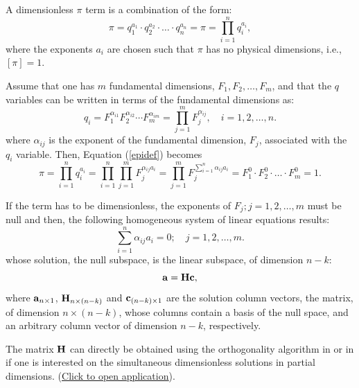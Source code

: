 \documentclass[
	11pt, %
	fleqn, %
	a4paper, %
]{LegrandOrangeBook}
\begin{document}
\begin{definition}
A dimensionless $\pi$ term is a combination of the form:
\begin{equation}\label{epidef}
\pi = q_1^{a_1} \cdot q_2^{a_2} \cdot \ldots \cdot q_n^{a_n} = \pi =\prod\limits_{i=1}^{n} q_i^{a_i},
\end{equation}
where the exponents $a_i$ are chosen such that $\pi$ has no physical dimensions, i.e., $[\pi] = 1$.
\end{definition}

Assume that one has $m$ fundamental dimensions, $F_1, F_2,\dots,F_m$, and that the $q$ variables can be written in terms of the fundamental dimensions as:
\begin{equation}
q_i = F_1^{\alpha_{i1}} F_2^{\alpha_{i2}} \cdots F_m^{\alpha_{im}} = \prod\limits_{j=1}^{m} F_j^{\alpha_{ij}},\quad i=1,2,\dots,n.
\end{equation}
where $\alpha_{ij}$ is the exponent of the fundamental dimension, $F_j$, associated with the $q_i$ variable.
Then, Equation (\ref{epidef}) becomes
\begin{equation}
\pi = \prod\limits_{i=1}^{n} q_i^{a_i }= \prod\limits_{i=1}^{n} \prod\limits_{j=1}^{m} F_j^{\alpha_{ij}a_{i}} = \prod\limits_{j=1}^{m}F_j^{\sum\limits_{i=1}^{n}\alpha_{ij}a_{i}}=F_1^0 \cdot F_2^0 \cdot \dots \cdot F_m^0 =1.
\end{equation}

If the term has to be dimensionless, the exponents of $F_j; j=1,2,\dots,m$ must be null and then, the following homogeneous system of linear equations results:
\begin{equation}\label{epidef1}
   \boxed{ \sum\limits_{i=1}^{n}\alpha_{ij}a_{i} = 0;\quad j=1,2,\dots,m.}
\end{equation}
whose solution, the null subspace, is the linear subspace, of dimension $n-k$:
\begin{equation}\label{epidef2}
    {\bf a} = {\bf H} {\bf c},
\end{equation}
where ${\bf a}_{n \times 1}$, ${\bf H}_{n \times (n-k)}$ and ${\bf c}_{(n-k) \times 1}$ are the solution column vectors, the matrix, of dimension $n \times (n-k)$, whose columns contain a basis of the null space, and an arbitrary column vector of dimension $n-k$, respectively.

The matrix ${\bf H}$ can directly be obtained using the orthogonality algorithm in \cite{castilloCJP:01} or in \cite{CASTILLO2002131} if one is interested on the simultaneous dimensionless solutions in partial dimensions. (\href{http://enriquecastilloron.github.io/PRUEBA/SolveHomogeneousSystemSteps.html}{\underline{Click to open application}}).
\end{document}
